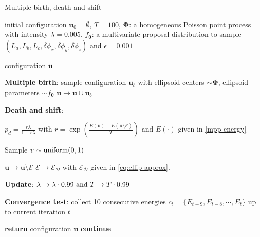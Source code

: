 \documentclass[journal]{IEEEtran}
\begin{document}
\begin{algorithm}
  \caption{Multiple birth, death and shift}
  \label{algo-mbds}
  \begin{algorithmic}[1]

    \REQUIRE initial configuration $\mathbf{u}_0 = \emptyset$,
    $T = 100$, $\mathbf{\Phi}$: a homogeneous Poisson point process
    with intensity $\lambda = 0.005$, $f_{\boldsymbol{\theta}}$: a
    multivariate proposal distribution to sample
    $ \left( L_a, L_b, L_c, \delta{\phi_x}, \delta{\phi_y},
      \delta{\phi_z} \right)$ and $\epsilon = 0.001$

    \ENSURE configuration $\mathbf{u}$

    \vspace{1mm} \REPEAT

    \vspace{1mm} \STATE \textbf{Multiple birth}: sample configuration
    $\mathbf{u}_b$ with ellipsoid centers $\sim \mathbf{\Phi}$,
    ellipsoid parameters $\sim f_{\boldsymbol{\theta}}$ \label{itr}
    \STATE $\mathbf{u} \rightarrow \mathbf{u} \cup \mathbf{u}_b$

    \vspace{1mm} \STATE \textbf{Death and shift}:

     \STATE
    $p_d = \frac{r\lambda}{1 + r\lambda}$ with
    $r = \exp \left( \frac{ E(\mathbf{u}) - E(\mathbf{u} \setminus
        \mathcal{E}) }{T} \right)$ and $E(\cdot)$ given in
    \eqref{mpp-energy}

    \STATE Sample $v \sim \textnormal{uniform}(0, 1)$

     \STATE
    $\mathbf{u} \rightarrow \mathbf{u} \setminus \mathcal{E}$ \ELSE
    \STATE $\mathcal{E} \rightarrow \mathcal{E}_{\mathcal{D}}$ with
    $\mathcal{E}_{\mathcal{D}}$ given in \eqref{eq:ellip-approx}.
    \ENDIF

    \ENDFOR

    \vspace{1mm} \STATE \textbf{Update}:
    $\lambda \rightarrow \lambda \cdot 0.99 \textnormal{ and } T
    \rightarrow T \cdot 0.99$

    \vspace{1mm} \STATE \textbf{Convergence test}: collect 10
    consecutive energies $c_t = \{E_{t-9}, E_{t-8}, \cdots, E_{t}\}$
    up to current iteration $t$

     \STATE \textbf{return} configuration $\mathbf{u}$
    \ELSE \STATE \textbf{continue} \ENDIF

  \end{algorithmic}
\end{algorithm}
\end{document}
